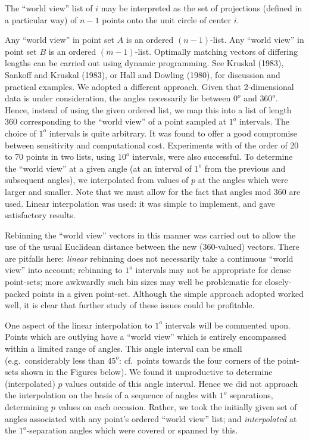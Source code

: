 The ``world view'' list of $i$ may be interpreted as the set of projections
(defined in a particular way) of $n-1$ points onto the unit circle of center
$i$.

Any ``world view'' in point set $A$ is an ordered $(n-1)$-list.  Any ``world
view'' in point set $B$ is an ordered $(m-1)$-list.  Optimally matching
vectors of differing lengths can be carried out using dynamic programming.
See Kruskal (1983), Sankoff and Kruskal (1983), or Hall
and Dowling (1980), for discussion and practical examples.  We adopted a
different approach.  Given that 2-dimensional data is under consideration,
the angles necessarily lie between $0^o$ and $360^o$.  Hence, instead of 
using the given ordered list, we map this into a list of length 360
corresponding to the ``world view'' of a point sampled at $1^o$ intervals.
The choice of $1^o$ intervals is quite arbitrary.  It was found 
to offer a good compromise between 
sensitivity and computational cost.  Experiments with of the order of 20 to 70
points in two lists, using $10^o$ intervals, were also successful.
To determine the ``world view'' at 
a given angle (at an interval of $1^o$ from the previous and subsequent
angles), we interpolated from values of $p$ at the angles which were larger
and smaller.  Note that we must allow for the fact that angles mod $360$ are
used.  Linear interpolation was used: it was simple to 
implement, and gave satisfactory results.   
 
Rebinning the ``world view'' vectors in this manner was carried out to 
allow the use of the usual Euclidean distance between the new (360-valued)
vectors.  There are pitfalls here: {\it linear} rebinning does not necessarily
take a continuous ``world view'' into account; rebinning to $1^o$ intervals
may not be appropriate for dense point-sets; more awkwardly such bin sizes
may well be problematic for closely-packed points in a given point-set.
Although the simple approach adopted worked well, it is clear that further
study of these issues could be profitable.

One aspect of the linear interpolation to $1^o$ intervals will be commented 
upon.  Points which are
outlying have a ``world view'' which is entirely encompassed within a 
limited range of angles.  This angle interval can be small (e.g.\ considerably
less than $45^o$: cf.\ points towards the four corners of the
point-sets shown in the Figures below).  We found it 
unproductive to determine (interpolated)
$p$ values outside of this angle interval.  Hence we did not approach the
interpolation on the basis of a sequence of angles with $1^o$ separations,
determining $p$ values on each occasion.  Rather, we took the initially
given set of angles associated with any point's ordered ``world view''
list; and {\it interpolated} at the $1^o$-separation angles which were
covered or spanned by this.  

